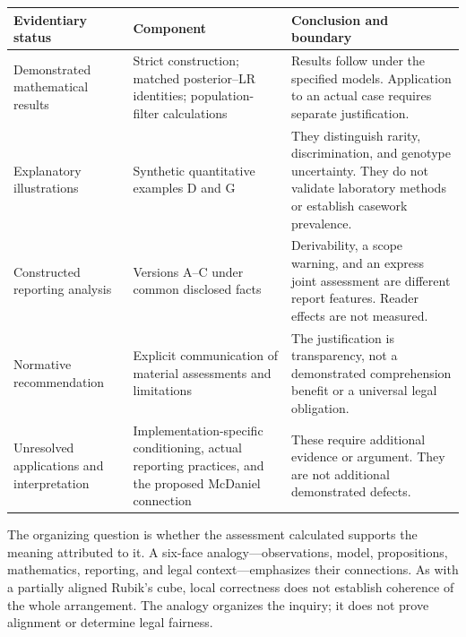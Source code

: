 \documentclass[
]{article}
\newcounter{none} %
\begin{document}
{\def\LTcaptype{none} %
\begin{longtable}[]{@{}
  >{\raggedright\arraybackslash}p{}
  >{\raggedright\arraybackslash}p{}
  >{\raggedright\arraybackslash}p{}@{}}
\toprule\noalign{}
\begin{minipage}[b]{\linewidth}\raggedright
Evidentiary status
\end{minipage} & \begin{minipage}[b]{\linewidth}\raggedright
Component
\end{minipage} & \begin{minipage}[b]{\linewidth}\raggedright
Conclusion and boundary
\end{minipage} \\
\midrule\noalign{}
\endhead
\bottomrule\noalign{}
\endlastfoot
Demonstrated mathematical results & Strict construction; matched
posterior--LR identities; population-filter calculations & Results
follow under the specified models. Application to an actual case
requires separate justification. \\
Explanatory illustrations & Synthetic quantitative examples D and G &
They distinguish rarity, discrimination, and genotype uncertainty. They
do not validate laboratory methods or establish casework prevalence. \\
Constructed reporting analysis & Versions A--C under common disclosed
facts & Derivability, a scope warning, and an express joint assessment
are different report features. Reader effects are not measured. \\
Normative recommendation & Explicit communication of material
assessments and limitations & The justification is transparency, not a
demonstrated comprehension benefit or a universal legal obligation. \\
Unresolved applications and interpretation & Implementation-specific
conditioning, actual reporting practices, and the proposed McDaniel
connection & These require additional evidence or argument. They are not
additional demonstrated defects. \\
\end{longtable}
}

The organizing question is whether the assessment calculated supports
the meaning attributed to it. A six-face analogy---observations, model,
propositions, mathematics, reporting, and legal context---emphasizes
their connections. As with a partially aligned Rubik's cube, local
correctness does not establish coherence of the whole arrangement. The
analogy organizes the inquiry; it does not prove alignment or determine
legal fairness.
\end{document}
